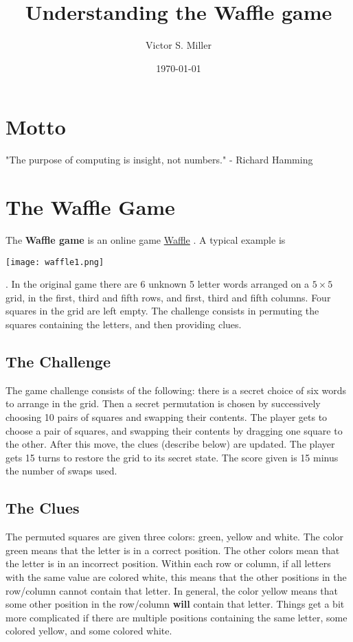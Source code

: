 \documentclass[11pt]{article}
\author{Victor S. Miller}
\date{\today}
\title{Understanding the Waffle game}
\begin{document}
\maketitle
\tableofcontents

\section{Motto}
\label{sec:org4f52622}
"The purpose of computing is insight, not numbers." - Richard Hamming
\section{The Waffle Game}
\label{sec:orgfcc6aad}
The \textbf{Waffle game} is an online game \href{https://wafflegame.net}{Waffle} .  A typical example is
\begin{center}
\texttt{[image: waffle1.png]}
\end{center}.  In the original game there are 6 unknown 5 letter
words arranged on a \(5 \times 5\) grid, in the first, third and fifth
rows, and first, third and fifth columns.  Four squares in the grid
are left empty.  The challenge consists in permuting the squares
containing the letters, and then providing clues. 
\subsection{The Challenge}
\label{sec:org94a623c}
The game challenge consists of the following: there is a secret choice
of six words to arrange in the grid.  Then a secret permutation is
chosen by successively choosing 10 pairs of squares and swapping their
contents.  The player gets to choose a pair of squares, and swapping
their contents by dragging one square to the other.  After this move,
the clues (describe below) are updated.  The player gets 15 turns to
restore the grid to its secret state.  The score given is 15 minus the
number of swaps used.
\subsection{The Clues}
\label{sec:org2b517a1}
The permuted squares are given three colors: green, yellow and white.
The color green means that the letter is in a correct position.  The
other colors mean that the letter is in an incorrect position.  Within
each row or column, if all letters with the same value are colored
white, this means that the other positions in the row/column cannot
contain that letter.  In general, the color yellow means that some
other position in the row/column \textbf{will} contain that letter.  Things
get a bit more complicated if there are multiple positions containing
the same letter, some colored yellow, and some colored white.
\end{document}
